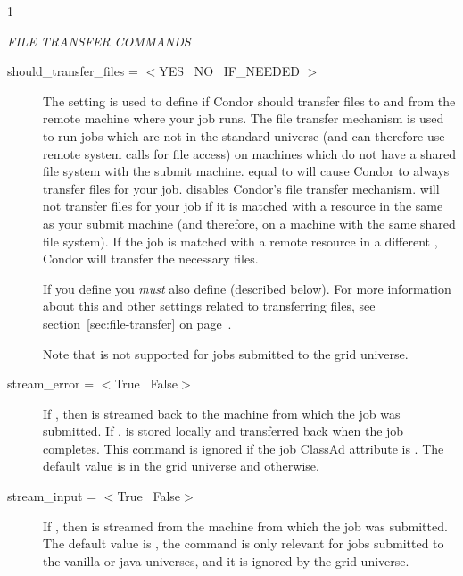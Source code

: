 \begin{ManPage}{\label{man-condor-submit}}{1}
\begin{description}
\end{description} 

\emph{FILE TRANSFER COMMANDS}
\begin{description} 


\item[should\_transfer\_files = $<$YES \Bar\ NO \Bar\ IF\_NEEDED $>$] 
The  setting is used to define if Condor
should transfer files to and from the remote machine where your job
runs.
The file transfer mechanism is used to run jobs which are not in the
standard universe (and can therefore use remote system calls for file
access) on machines which do not have a shared file system with the
submit machine.
 equal to  will cause Condor to
always transfer files for your job.
 disables Condor's file transfer mechanism.
 will not transfer files for your job if it is matched
with a resource in the same  as your submit
machine (and therefore, on a machine with the same shared file
system).
If the job is matched with a remote resource in a different 
, Condor will transfer the necessary files. 

If you define  you \emph{must} also
define  (described below).
For more information about this and other settings related to
transferring files, see section~\ref{sec:file-transfer} on
page~\pageref{sec:file-transfer}.

Note that  is not supported
for jobs submitted to the grid universe.

\item[stream\_error = $<$True \Bar\ False$>$]
If , then  is streamed back to
the machine from which the job was submitted.
If ,  is stored locally
and transferred back when the job completes.
This command is ignored if the job ClassAd attribute
 is
.
The default value is  in the grid
universe and  otherwise.

\item[stream\_input = $<$True \Bar\ False$>$]
If , then  is streamed from the
machine from which the job was submitted.
The default value is ,
the command is only relevant for jobs submitted to
the vanilla or java universes, and
it is ignored by the grid
universe.


\end{description}
\end{ManPage}
